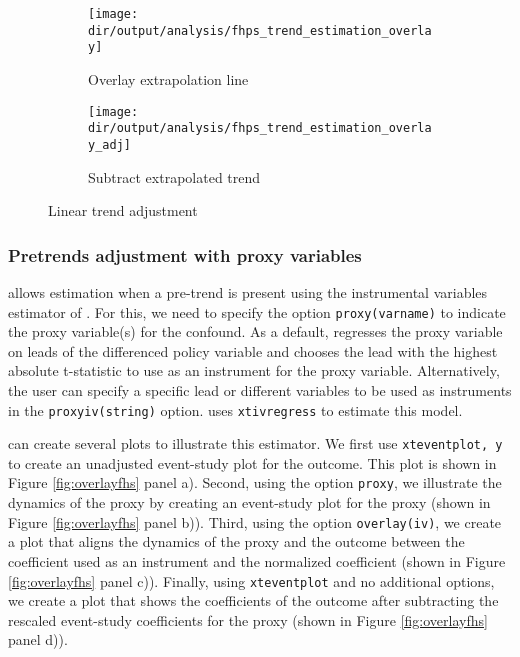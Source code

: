 \documentclass[12pt]{article}
\begin{document}
\begin{figure}[h!]
	\centering
	\begin{subfigure}{.5\textwidth}
		\centering
		\texttt{[image: \\dir/output/analysis/fhps\_trend\_estimation\_overlay]}
		\caption{Overlay extrapolation line}
		\label{fig:overlay_trend}
	\end{subfigure}%
	\begin{subfigure}{.5\textwidth}
		\centering
		\texttt{[image: \\dir/output/analysis/fhps\_trend\_estimation\_overlay\_adj]}
		\caption{Subtract extrapolated trend}
		\label{fig:subtract_trend}
	\end{subfigure}
	\caption{Linear trend adjustment}
	\label{fig:trend}
\end{figure}

\subsubsection*{Pretrends adjustment with proxy variables}

\xtevent allows estimation when a pre-trend is present using the instrumental variables estimator of \citet{freyaldenhoven2019pre}.
For this, we need to specify the option \texttt{proxy(varname)} to indicate the proxy variable(s) for the confound.
As a default, \xtevent regresses the proxy variable on leads of the differenced policy variable and chooses the lead with the highest absolute t-statistic to use as an instrument for the proxy variable.
Alternatively, the user can specify a specific lead or different variables to be used as instruments in the \texttt{proxyiv(string)} option.
\xtevent uses \texttt{xtivregress} to estimate this model.

\begin{stlog}
	\nullskip
\end{stlog}

\xteventplot can create several plots to illustrate this estimator.
We first use \texttt{xteventplot, y} to create an unadjusted event-study plot for the outcome.
This plot is shown in Figure \ref{fig:overlayfhs} panel a).
Second, using the option \texttt{proxy}, we illustrate the dynamics of the proxy by creating an event-study plot for the proxy (shown in Figure \ref{fig:overlayfhs} panel b)).
Third, using the option \texttt{overlay(iv)}, we create a plot that aligns the dynamics of the proxy and the outcome between the coefficient used as an instrument and the normalized coefficient (shown in Figure \ref{fig:overlayfhs} panel c)).
Finally, using \texttt{xteventplot} and no additional options, we create a plot that shows the coefficients of the outcome after subtracting the rescaled event-study coefficients for the proxy (shown in Figure \ref{fig:overlayfhs} panel d)).
\begin{stlog}
	\nullskip
	\nullskip
	\nullskip
	\nullskip
\end{stlog}
\end{document}
